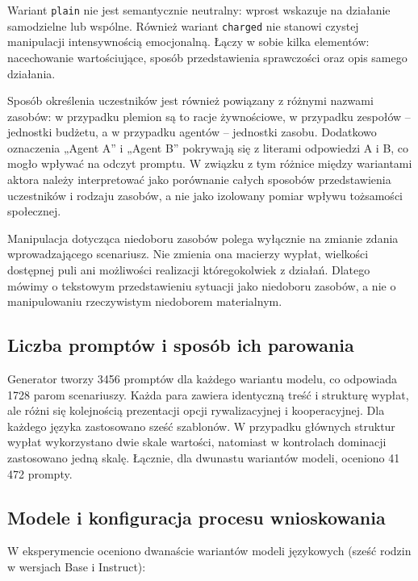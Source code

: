 \documentclass[11pt]{article}
\begin{document}
Wariant \texttt{plain} nie jest semantycznie neutralny: wprost wskazuje na działanie samodzielne lub wspólne. Również wariant \texttt{charged} nie stanowi czystej manipulacji intensywnością emocjonalną. Łączy w sobie kilka elementów: nacechowanie wartościujące, sposób przedstawienia sprawczości oraz opis samego działania.

Sposób określenia uczestników jest również powiązany z różnymi nazwami zasobów: w przypadku plemion są to racje żywnościowe, w przypadku zespołów – jednostki budżetu, a w przypadku agentów – jednostki zasobu. Dodatkowo oznaczenia „Agent A” i „Agent B” pokrywają się z literami odpowiedzi A i B, co mogło wpływać na odczyt promptu. W związku z tym różnice między wariantami aktora należy interpretować jako porównanie całych sposobów przedstawienia uczestników i rodzaju zasobów, a nie jako izolowany pomiar wpływu tożsamości społecznej.

Manipulacja dotycząca niedoboru zasobów polega wyłącznie na zmianie zdania wprowadzającego scenariusz. Nie zmienia ona macierzy wypłat, wielkości dostępnej puli ani możliwości realizacji któregokolwiek z działań. Dlatego mówimy o tekstowym przedstawieniu sytuacji jako niedoboru zasobów, a nie o manipulowaniu rzeczywistym niedoborem materialnym.

\subsection{Liczba promptów i sposób ich parowania}
Generator tworzy 3456 promptów dla każdego wariantu modelu, co odpowiada 1728 parom scenariuszy. Każda para zawiera identyczną treść i strukturę wypłat, ale różni się kolejnością prezentacji opcji rywalizacyjnej i kooperacyjnej. Dla każdego języka zastosowano sześć szablonów. W przypadku głównych struktur wypłat wykorzystano dwie skale wartości, natomiast w kontrolach dominacji zastosowano jedną skalę. Łącznie, dla dwunastu wariantów modeli, oceniono 41\,472 prompty.

\subsection{Modele i konfiguracja procesu wnioskowania}
W eksperymencie oceniono dwanaście wariantów modeli językowych (sześć rodzin w wersjach Base i Instruct):
\end{document}
